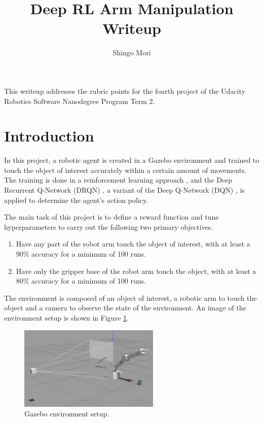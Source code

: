 \documentclass[a4paper]{article}
\title{Deep RL Arm Manipulation Writeup}
\author{Shingo Mori}
\begin{document}
\maketitle

This writeup addresses the rubric points for the fourth project of the Udacity Robotics Software Nanodegree Program Term 2.

\section{Introduction}
In this project, a robotic agent is created in a Gazebo environment and trained to touch the object of interest accurately within a certain amount of movements. The training is done in a reinforcement learning approach \cite{Sutton:1998:IRL:551283}, and the Deep Recurrent Q-Network (DRQN) \cite{Hausknecht2015}, a variant of the Deep Q-Network (DQN) \cite{Zhan2016}, is applied to determine the agent's action policy.

The main task of this project is to define a reward function and tune hyperparameters to carry out the following two primary objectives.

\begin{enumerate}
    \item Have any part of the robot arm touch the object of interest, with at least a 90\% accuracy for a minimum of 100 runs.
    \item Have only the gripper base of the robot arm touch the object, with at least a 80\% accuracy for a minimum of 100 runs.
\end{enumerate}

The environment is composed of an object of interest, a robotic arm to touch the object and a camera to observe the state of the environment. An image of the environment setup is shown in Figure \ref{fig:environment}.

\begin{figure}[ht]
\centering
\includegraphics[width=0.6\textwidth]{environment}
\caption{Gazebo environment setup. }
\label{fig:environment}
\end{figure}
\end{document}
